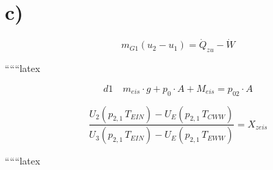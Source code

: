 

\section*{c)}

\begin{equation*}
m_{G1} (u_2 - u_1) = \dot{Q}_{zu} - \dot{W}
\end{equation*}

``````latex

\begin{equation}
d1 \quad m_{eis} \cdot g + p_0 \cdot A + M_{eis} = p_{02} \cdot A
\end{equation}

\begin{equation}
\frac{U_2 \left( p_{2,1} \, T_{EIN} \right) - U_E \left( p_{2,1} \, T_{CWW} \right)}{U_3 \left( p_{2,1} \, T_{EIN} \right) - U_E \left( p_{2,1} \, T_{EWW} \right)} = X_{zeis}
\end{equation}

``````latex